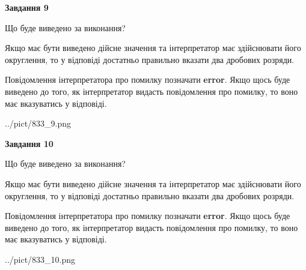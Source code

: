 \documentclass[12pt, ukrainian]{article}
\begin{document}
{\begin {Large}
{\begin {center}\textbf{Завдання 9}\end {center}}\par
Що буде виведено за виконання? \par

Якщо має бути виведено дійсне значення та інтерпретатор має здійснювати його округлення, 
то у відповіді достатньо правильно вказати два дробових розряди.

Повідомлення інтерпретатора про помилку позначати \textbf{error}.
Якщо щось буде виведено до того, як інтерпретатор видасть повідомлення про помилку, 
то воно має вказуватись у відповіді. \par

\begin{center}
	{../pict/833_9.png}
\end{center}
\newpage

{\begin {center}\textbf{Завдання 10}\end {center}}\par
Що буде виведено за виконання? \par

Якщо має бути виведено дійсне значення та інтерпретатор має здійснювати його округлення, 
то у відповіді достатньо правильно вказати два дробових розряди.

Повідомлення інтерпретатора про помилку позначати \textbf{error}.
Якщо щось буде виведено до того, як інтерпретатор видасть повідомлення про помилку, 
то воно має вказуватись у відповіді. \par

\begin{center}
	{../pict/833_10.png}
\end{center}
\newpage

\end {Large}}
\end{document}
